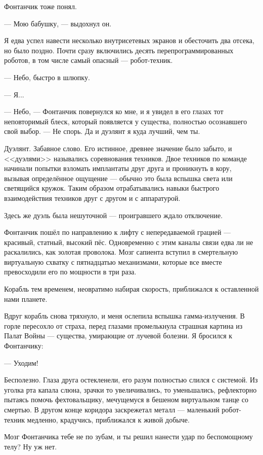 Фонтанчик тоже понял.

--- Мою бабушку, --- выдохнул он.

Я едва успел навести несколько внутрисетевых экранов и обесточить два отсека, но было поздно.
Почти сразу включились десять перепрограммированных роботов, в том числе самый опасный --- робот-техник.

--- Небо, быстро в шлюпку.

--- Я...

--- Небо, --- Фонтанчик повернулся ко мне, и я увидел в его глазах тот неповторимый блеск, который появляется у существа, полностью осознавшего свой выбор.
--- Не спорь.
Да и дуэлянт я куда лучший, чем ты.

Дуэлянт.
Забавное слово.
Его истинное, древнее значение было забыто, и <<дуэлями>> назывались соревнования техников.
Двое техников по команде начинали попытки взломать имплантаты друг друга и проникнуть в кору, вызывая определённое ощущение --- обычно это была вспышка света или светящийся кружок.
Таким образом отрабатывались навыки быстрого взаимодействия техников друг с другом и с аппаратурой.

Здесь же дуэль была нешуточной --- проигравшего ждало отключение.

Фонтанчик пошёл по направлению к лифту с непередаваемой грацией --- красивый, статный, высокий пёс.
Одновременно с этим каналы связи едва ли не раскалились, как золотая проволока.
Мозг сапиента вступил в смертельную виртуальную схватку с пятнадцатью механизмами, которые все вместе превосходили его по мощности в три раза.

Корабль тем временем, неовратимо набирая скорость, приближался к оставленной нами планете.

Вдруг корабль снова тряхнуло, и меня ослепила вспышка гамма-излучения.
В горле пересохло от страха, перед глазами промелькнула страшная картина из Палат Войны --- существа, умирающие от лучевой болезни.
Я бросился к Фонтанчику:

--- Уходим!

Бесполезно.
Глаза друга остекленели, его разум полностью слился с системой.
Из уголка рта капала слюна, зрачки то увеличивались, то уменьшались, рефлекторно пытаясь помочь фехтовальщику, мечущемуся в бешеном виртуальном танце со смертью.
В другом конце коридора заскрежетал металл --- маленький робот-техник медленно, крадучись, приближался к живой добыче.

Мозг Фонтанчика тебе не по зубам, и ты решил нанести удар по беспомощному телу?
Ну уж нет.

